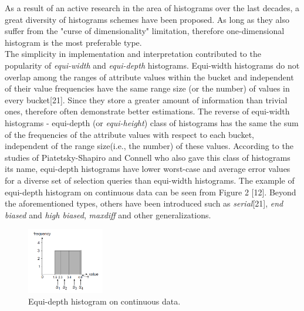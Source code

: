 \documentclass[10pt, conference, compsocconf]{IEEEtran}
\begin{document}

As a result of an active research in the area of histograms over the last decades, a great diversity of histograms schemes have been proposed.  
As long as they also suffer from the "curse of dimensionality" limitation, therefore one-dimensional histogram is the most preferable type. \\The simplicity in implementation and interpretation contributed to the popularity of \textit{equi-width} and \textit{equi-depth} histograms. Equi-width histograms do not overlap among the ranges of attribute values within the bucket and independent of their value frequencies have the same range size (or the number) of values in every bucket[21]. Since they store a greater amount of information than trivial ones, therefore often demonstrate better estimations. The reverse of equi-width histograms - equi-depth (or \textit{equi-height}) class of histograms has the same the sum of the frequencies of the attribute values with respect to each bucket, independent of the range size(i.e., the number) of these values. According to the studies of Piatetsky-Shapiro and Connell who also gave this class of histograms its name, equi-depth histograms have lower worst-case and average error values for a diverse set of selection queries than equi-width histograms. The example of equi-depth histogram on continuous data can be seen from Figure 2 [12].
Beyond the aforementioned types, others have been introduced such as \textit{serial}[21], \textit{end biased} and \textit{high biased}, \textit{maxdiff} and other generalizations. 

\label{fig:equi-depth_histograms}
\begin{figure} \includegraphics[width=0.3\textwidth, center]{img/equi-depth_histogram.png} 
\caption[Equi-depth histogram on continuous data.]%
{Equi-depth histogram on continuous data.\footnotemark}
\end{figure}
\end{document}
